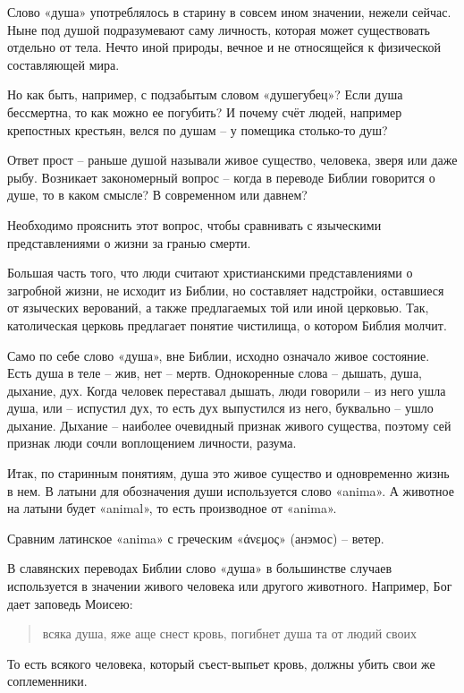 \documentclass[a5paper,11pt,openany]{article}
\begin{document}
   Слово «душа» употреблялось в старину в совсем ином значении, нежели сейчас. Ныне под душой подразумевают саму личность, которая может существовать отдельно от тела. Нечто иной природы, вечное и не относящейся к физической составляющей мира.

    Но как быть, например, с подзабытым словом «душегубец»? Если душа бессмертна, то как можно ее погубить? И почему счёт людей, например крепостных крестьян, велся по душам – у помещика столько-то душ?

    Ответ прост – раньше душой называли живое существо, человека, зверя или даже рыбу. Возникает закономерный вопрос – когда в переводе Библии говорится о душе, то в каком смысле? В современном или давнем?

   Необходимо прояснить этот вопрос, чтобы сравнивать с языческими представлениями о жизни за гранью смерти.

   Большая часть того, что люди считают христианскими представлениями о загробной жизни, не исходит из Библии, но составляет надстройки, оставшиеся от языческих верований, а также предлагаемых той или иной церковью. Так, католическая церковь предлагает понятие чистилища, о котором Библия молчит.

   Само по себе слово «душа», вне Библии, исходно означало живое состояние. Есть душа в теле – жив, нет – мертв. Однокоренные слова – дышать, душа, дыхание, дух. Когда человек переставал дышать, люди говорили – из него ушла душа, или – испустил дух, то есть дух выпустился из него, буквально – ушло дыхание. Дыхание – наиболее очевидный признак живого существа, поэтому сей признак люди сочли воплощением личности, разума.

    Итак, по старинным понятиям, душа это живое существо и одновременно жизнь в нем. В латыни для обозначения души используется слово «anima». А животное на латыни будет «animal», то есть производное от «anima».
  
   Сравним латинское «anima» с греческим «άνεμος» (анэмос) – ветер. 

   В славянских переводах Библии слово «душа» в большинстве случаев используется в значении живого человека или другого животного. Например, Бог дает заповедь Моисею:

\begin{quotation}
\noindent всяка душа, яже аще снест кровь, погибнет душа та от людий своих
\end{quotation}

   То есть всякого человека, который съест-выпьет кровь, должны убить свои же соплеменники.
\end{document}
